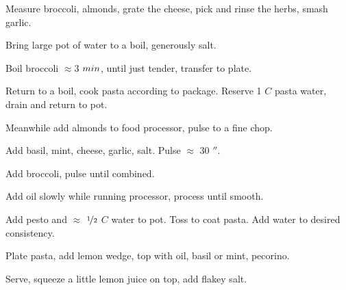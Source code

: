 \begin{preparation}
\item Measure broccoli, almonds, grate the cheese, pick and rinse the herbs, smash garlic.
\item Bring large pot of water to a boil, generously salt.
\item Boil broccoli $\approx3$ $\minute$, until just tender, transfer to plate.
\item Return to a boil, cook pasta according to package.
	Reserve 1 $C$ pasta water, drain and return to pot.
\item Meanwhile add almonds to food processor, pulse to a fine chop.
\item Add basil, mint, cheese, garlic, salt.
	Pulse $\approx$ $30$ $\second$.
\item Add broccoli, pulse until combined.
\item Add oil slowly while running processor, process until smooth.
\item Add pesto and $\approx$ $\onehalf$ $C$ water to pot.
	Toss to coat pasta.
	Add water to desired consistency.
\item Plate pasta, add lemon wedge, top with oil, basil or mint, pecorino.
\item Serve, squeeze a little lemon juice on top, add flakey salt.
\end{preparation}


\recipeend%
